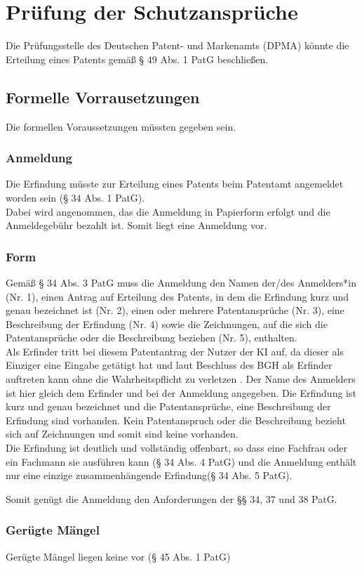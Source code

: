 \section{Prüfung der Schutzansprüche}
Die Prüfungsstelle des Deutschen Patent- und Markenamts (DPMA) könnte die Erteilung eines
Patents gemäß § 49 Abs. 1 PatG beschließen.
\subsection{Formelle Vorrausetzungen}
Die formellen Voraussetzungen müssten gegeben sein.
\subsubsection{Anmeldung}
Die Erfindung müsste zur Erteilung eines Patents beim Patentamt angemeldet worden sein (§ 34 Abs.
1 PatG).
\\
Dabei wird angenommen,
das die Anmeldung in Papierform erfolgt und die Anmeldegebühr bezahlt ist. 
Somit liegt eine Anmeldung vor.
\subsubsection{Form}
Gemäß § 34 Abs. 3 PatG muss die Anmeldung den Namen der/des Anmelders*in (Nr. 1), einen
Antrag auf Erteilung des Patents, in dem die Erfindung kurz und genau bezeichnet ist (Nr. 2), einen
oder mehrere Patentansprüche (Nr. 3), eine Beschreibung der Erfindung (Nr. 4) sowie die
Zeichnungen, auf die sich die Patentansprüche oder die Beschreibung beziehen (Nr. 5), enthalten.
\\
Als Erfinder tritt bei diesem Patentantrag der Nutzer der
KI auf, da dieser als Einziger eine Eingabe getätigt hat und
laut Beschluss des BGH als Erfinder auftreten kann ohne die Wahrheitspflicht
zu verletzen \cite{BPatG21122021}. 
Der Name des Anmelders ist hier gleich dem Erfinder und bei der
Anmeldung angegeben. 
Die Erfindung ist kurz und genau bezeichnet und die Patentansprüche, 
eine Beschreibung der Erfindung
sind vorhanden. 
Kein Patentanspruch oder die Beschreibung bezieht sich auf Zeichnungen
und somit sind keine vorhanden.
\\
Die Erfindung ist deutlich und vollständig offenbart, 
so dass eine Fachfrau
oder ein Fachmann sie ausführen kann (§ 34 Abs. 4 PatG) und die
Anmeldung enthält nur eine einzige zusammenhängende Erfindung(§ 34 Abs. 5 PatG). 

Somit genügt die Anmeldung den Anforderungen der §§ 34, 37 und 38 PatG.
\subsubsection{Gerügte Mängel}
Gerügte Mängel liegen keine vor (§ 45 Abs. 1 PatG)

